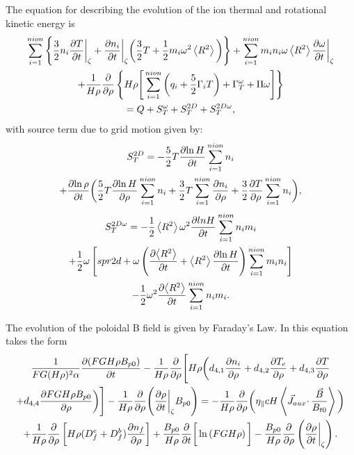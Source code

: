 The equation for describing the evolution of the ion
thermal  and rotational kinetic energy is
\begin{multline} 
 \sum_{i=1}^{nion}\left\{\frac{3}{2}n_i\frac{\partial{T}}{\partial{ t}}\bigg \vert_{\zeta} + 
 \frac{\partial{n_i}}{\partial{ t}}\bigg \vert_{\zeta}\bigg(\frac{3}{2}T+\frac{1}{2}m_i\omega^2\left<R^2\right> \bigg)\right\} 
 + \sum_{i=1}^{nion} m_in_i\omega\left<R^2\right>\frac{\partial{\omega}}{\partial{ t}}\bigg \vert_{\zeta} \\
 +\frac{1}{H\rho}\frac{\partial}{\partial \rho}\left\{H\rho\Bigg [\sum_{i=1}^{nion}\left(
 q_i+\frac{5}{2}\Gamma_i T\right) +\Gamma_T^\omega
 +\Pi\omega\Bigg]\right\}\\
 = Q +S_T^\omega+ S^{2D}_{T}+S^{2D\omega}_{T}            
 \label{eq:ione},
\end{multline}
with source term due to grid motion given by:
\begin{multline}  
 S_T^{2D}= -\frac{5}{2}T\frac{\partial{ \ln H}}{\partial{ t}} \sum_{i=1}^{nion} n_i\\
 +\frac{\partial{ \ln \rho}}{\partial{ t}}
 \bigg (  
 \frac{5}{2}T\frac{\partial{ \ln H}}{\partial{ \rho}}\sum_{i=1}^{nion} n_i 
 +\frac{3}{2}T\sum_{i=1}^{nion}\frac{\partial{ n_i}}{\partial{ \rho}}
 +\frac{3}{2}\frac{\partial{ T}}{\partial{ \rho}}\sum_{i=1}^{nion} n_i
 \bigg )   ,
\end{multline}
\begin{multline}  
 S_T^{2D\omega}= -\frac{1}{2}\left<R^2\right>\omega^2\frac{\partial{ ln H}}{\partial{ t}}
 \sum_{i=1}^{nion}n_i m_i \\  
 +\frac{1}{2}\omega\left[ spr2d +\omega\left(\frac{\partial{ \left<R^2\right>}}{\partial{ t}}
 +\left<R^2\right>\frac{\partial{ \ln H}}{\partial{ t}}\right)\sum_{i=1}^{nion}m_in_i \right] \\
 -\frac{1}{2}\omega^2\frac{\partial{ \left<R^2\right>}}{\partial{ t}}\sum_{i=1}^{nion}n_im_i .
\end{multline} 

The evolution of the poloidal B field is given by Faraday's Law. In \ot this
equation takes the form
\begin{multline}
 \frac {1}{ FG(H\rho)^2\alpha}\frac{\partial{ (FGH\rho B_{p0})}}{\partial{ t}} 
 -\frac{1}{ H\rho}\frac{\partial{  }}{\partial{ \rho}}
 \Bigg [H\rho \bigg (d_{4,1}\frac{\partial{ n_i}}{\partial{ \rho}} 
 +d_{4,2}\frac{\partial{ T_e}}{\partial{ \rho}} +d_{4,3}\frac{\partial{ T}}{\partial{ \rho}} \\  
 +d_{4,4}\frac{\partial{ FGH\rho B_{p0}}}{\partial{ \rho}} \bigg)\Bigg]  
 -\frac{1}{H\rho}\frac{\partial}{\partial \rho} {\left (\frac{\partial{\rho}}{\partial{ t}}\bigg \vert_{\zeta}B_{p0}\right )}   
 =-\frac{1}{ H\rho}\frac{\partial{  }}{\partial{ \rho}} 
 \bigg(\eta_{\parallel} c H\left<{\vec {J}_{aux}} 
 \cdotp \frac{\vec {B}}{ B_{t0}}\right> \bigg)\\
 +\frac{1}{ H\rho} \frac{\partial{  }}{\partial{ \rho}} 
 \left[H\rho(D_f^e +D_f^b)\frac{\partial{  n_f}}{\partial{ \rho}}  \right]
 +\frac{B_{p0}}{ H\rho } \frac{\partial{  }}{\partial{ t}} 
 \bigg [ \ln \left(FGH\rho \right)\bigg]
 -\frac{B_{p0}}{ H\rho } \frac{\partial}{\partial \rho}\left (
 \frac{\partial{\rho}}{\partial{ t}}\bigg \vert_{\zeta} \right )\label{eq:fday1_3}.
\end{multline} 

